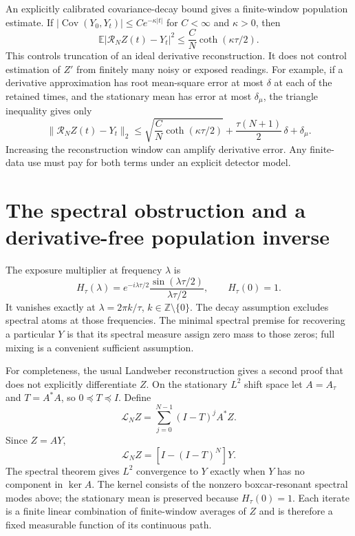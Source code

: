An explicitly calibrated covariance-decay bound gives a finite-window
population estimate. If
$|\operatorname{Cov}(Y_0,Y_t)|\leq C e^{-\kappa|t|}$ for $C<\infty$
and $\kappa>0$, then
\begin{equation}
 \mathbb E|\mathcal R_N Z(t)-Y_t|^2
 \leq\frac{C}{N}\coth(\kappa\tau/2).
 \label{eq:dg-reconstruction-rate}
\end{equation}
This controls truncation of an ideal derivative reconstruction. It does
not control estimation of $Z'$ from finitely many noisy or exposed readings.
For example, if a derivative approximation has root mean-square error at
most $\delta$ at each of the retained times, and the stationary mean has
error at most $\delta_\mu$, the triangle inequality gives only
\[
 \|\widehat{\mathcal R_N Z}(t)-Y_t\|_2
 \leq \sqrt{\frac C N\coth(\kappa\tau/2)}
       +\frac{\tau(N+1)}2\,\delta+\delta_\mu.
\]
Increasing the reconstruction window can amplify derivative error. Any
finite-data use must pay for both terms under an explicit detector model.

\section{The spectral obstruction and a derivative-free population inverse}

The exposure multiplier at frequency $\lambda$ is
\begin{equation}
 H_\tau(\lambda)
 =e^{-i\lambda\tau/2}\frac{\sin(\lambda\tau/2)}{\lambda\tau/2},
 \qquad H_\tau(0)=1.
 \label{eq:dg-transfer}
\end{equation}
It vanishes exactly at $\lambda=2\pi k/\tau$, $k\in\mathbb Z\setminus\{0\}$.
The decay assumption excludes spectral atoms at those frequencies. The
minimal spectral premise for recovering a particular $Y$ is that its
spectral measure assign zero mass to those zeros; full mixing is a convenient
sufficient assumption.

For completeness, the usual Landweber reconstruction gives a second proof
that does not explicitly differentiate $Z$. On the stationary $L^2$ shift
space let $A=A_\tau$ and $T=A^*A$, so $0\preceq T\preceq I$. Define
\begin{equation}
 \mathcal L_N Z
   =\sum_{j=0}^{N-1}(I-T)^jA^*Z.
 \label{eq:dg-landweber}
\end{equation}
Since $Z=AY$,
\[
 \mathcal L_N Z=[I-(I-T)^N]Y.
\]
The spectral theorem gives $L^2$ convergence to $Y$ exactly when $Y$ has no
component in $\ker A$. The kernel consists of the nonzero boxcar-resonant
spectral modes above; the stationary mean is preserved because $H_\tau(0)=1$.
Each iterate is a finite linear combination of finite-window averages of
$Z$ and is therefore a fixed measurable function of its continuous path.

